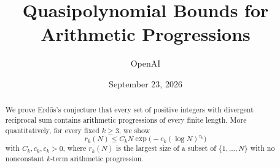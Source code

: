 \documentclass[11pt]{article}
\title{Quasipolynomial Bounds for Arithmetic Progressions}
\author{OpenAI}
\date{September 23, 2026}
\begin{document}
\maketitle
\begin{abstract}
We prove Erd\H{o}s's conjecture that every set of positive integers
with divergent reciprocal sum contains arithmetic progressions of every
finite length. More quantitatively, for every fixed $k\ge3$, we show
\[
 r_k(N)\le C_kN\exp\bigl(-c_k(\log N)^{\varepsilon_k}\bigr)
\]
with $C_k,c_k,\varepsilon_k>0$, where $r_k(N)$ is the largest size
of a subset of $\{1,\ldots,N\}$ with no nonconstant $k$-term
arithmetic progression.
\end{abstract}
\tableofcontents












\clearpage
\appendix

\clearpage

\end{document}
